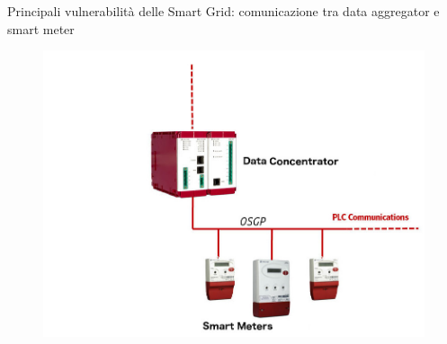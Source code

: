 \begin{frame}{Principali vulnerabilità delle Smart Grid: comunicazione tra data aggregator e smart meter}
	\begin{figure}[h] 
		\includegraphics[scale=0.3,cfbox=blue_slides 1pt 0pt]{imgs/aggregator.jpg}
	\end{figure}
\end{frame}


